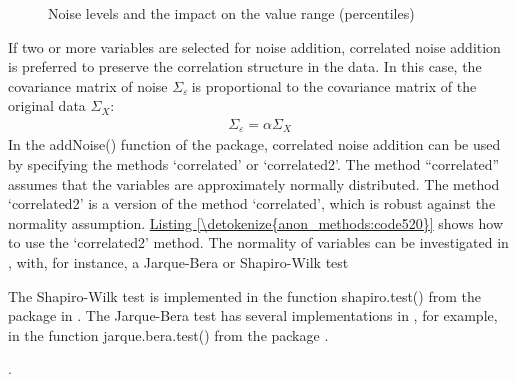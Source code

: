 \documentclass[letterpaper,10pt,english]{sphinxmanual}
\begin{document}
\begin{figure}[htbp]
\centering
\capstart

\noindent{}
\caption{Noise levels and the impact on the value range (percentiles)}\label{\detokenize{anon_methods:fig58}}\label{\detokenize{anon_methods:id45}}\end{figure}

If two or more variables are selected for noise addition, correlated
noise addition is preferred to preserve the correlation structure in the
data. In this case, the covariance matrix of noise
\(\Sigma_{\varepsilon}\ \)is proportional to the covariance matrix
of the original data \(\Sigma_{X}:\)
\begin{equation*}
\begin{split}\Sigma_{\varepsilon} = \alpha \Sigma_{X}\end{split}
\end{equation*}
In the addNoise() function of the  package, correlated noise
addition can be used by specifying the methods ‘correlated’ or
‘correlated2’. The method “correlated” assumes that the variables are
approximately normally distributed. The method ‘correlated2’ is a
version of the method ‘correlated’, which is robust against the
normality assumption. \hyperref[\detokenize{anon_methods:code520}]{Listing \ref{\detokenize{anon_methods:code520}}} shows how to use the ‘correlated2’
method. The normality of variables can be investigated in , with, for
instance, a Jarque-Bera or Shapiro-Wilk test %
\begin{footnote}[20]\sphinxAtStartFootnote
The Shapiro-Wilk test is implemented in the function shapiro.test()
from the package  in . The Jarque-Bera test has several
implementations in , for example, in the function
jarque.bera.test() from the package .
%
\end{footnote}.
\end{document}
